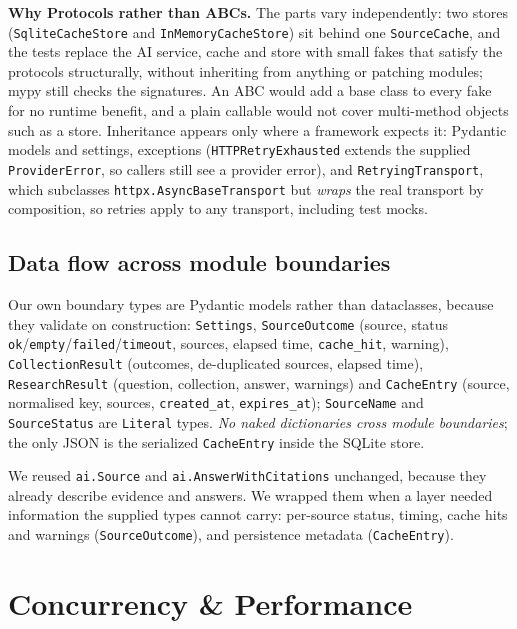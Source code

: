 \documentclass[11pt,a4paper]{article}
\newcommand{\cmd}[1]{\texttt{#1}}
\begin{document}
\textbf{Why Protocols rather than ABCs.} The parts vary independently: two
stores (\texttt{SqliteCacheStore} and \texttt{InMemoryCacheStore}) sit behind one
\texttt{SourceCache}, and the tests replace the AI service, cache and store with
small fakes that satisfy the protocols structurally, without inheriting from
anything or patching modules; mypy still checks the signatures. An ABC would add
a base class to every fake for no runtime benefit, and a plain callable would not
cover multi-method objects such as a store. Inheritance appears only where a
framework expects it: Pydantic models and settings, exceptions
(\texttt{HTTPRetryExhausted} extends the supplied \texttt{ProviderError}, so
callers still see a provider error), and \texttt{RetryingTransport}, which
subclasses \texttt{httpx.AsyncBaseTransport} but \emph{wraps} the real transport
by composition, so retries apply to any transport, including test mocks.

\subsection{Data flow across module boundaries}

Our own boundary types are Pydantic models rather than dataclasses, because they
validate on construction: \texttt{Settings}, \texttt{SourceOutcome} (source,
status \cmd{ok}/\cmd{empty}/\cmd{failed}/\cmd{timeout}, sources, elapsed time,
\cmd{cache\_hit}, warning), \texttt{CollectionResult} (outcomes, de-duplicated
sources, elapsed time), \texttt{ResearchResult} (question, collection, answer,
warnings) and \texttt{CacheEntry} (source, normalised key, sources,
\cmd{created\_at}, \cmd{expires\_at}); \cmd{SourceName} and \cmd{SourceStatus}
are \texttt{Literal} types. \emph{No naked dictionaries cross module boundaries};
the only JSON is the serialized \texttt{CacheEntry} inside the SQLite store.

We reused \cmd{ai.Source} and \cmd{ai.AnswerWithCitations} unchanged, because
they already describe evidence and answers. We wrapped them when a layer needed
information the supplied types cannot carry: per-source status, timing, cache
hits and warnings (\texttt{SourceOutcome}), and persistence metadata
(\texttt{CacheEntry}).

\section{Concurrency \& Performance}\label{sec:concurrency}
\end{document}
